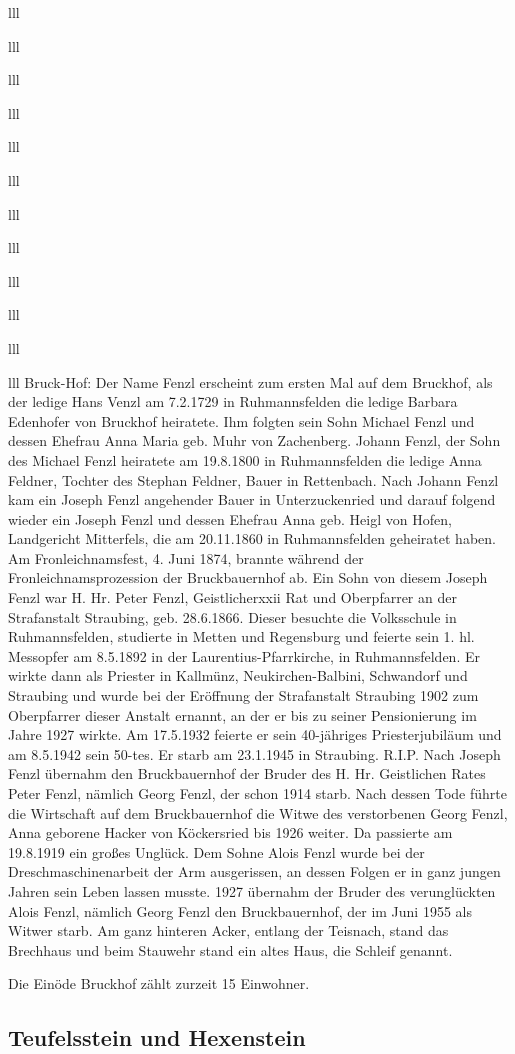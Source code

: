 \documentclass[12pt,a4pager]{book}
\begin{document}
\begin{tabuluar}{lll}
\begin{tabuluar}{lll}
\begin{tabuluar}{lll}
\begin{tabuluar}{lll}
\begin{tabuluar}{lll}
\begin{tabuluar}{lll}
\begin{tabuluar}{lll}
\begin{tabuluar}{lll}
\begin{tabuluar}{lll}
\begin{tabuluar}{lll}
\begin{tabuluar}{lll}
\begin{tabuluar}{lll}
Bruck-Hof: Der Name Fenzl erscheint zum ersten Mal auf dem Bruckhof, als der
ledige Hans Venzl am 7.2.1729 in Ruhmannsfelden die ledige Barbara Edenhofer von
Bruckhof heiratete. Ihm folgten sein Sohn Michael Fenzl und dessen Ehefrau Anna
Maria geb. Muhr von Zachenberg. Johann Fenzl, der Sohn des Michael Fenzl
heiratete am 19.8.1800 in Ruhmannsfelden die ledige Anna Feldner, Tochter des
Stephan Feldner, Bauer in Rettenbach. Nach Johann Fenzl kam ein Joseph Fenzl
angehender Bauer in Unterzuckenried und darauf folgend wieder ein Joseph Fenzl
und dessen Ehefrau Anna geb. Heigl von Hofen, Landgericht Mitterfels, die am
20.11.1860 in Ruhmannsfelden geheiratet haben. Am Fronleichnamsfest, 4. Juni
1874, brannte während der Fronleichnamsprozession der Bruckbauernhof ab. Ein
Sohn von diesem Joseph Fenzl war H. Hr. Peter Fenzl, Geistlicherxxii Rat und
Oberpfarrer an der Strafanstalt Straubing, geb. 28.6.1866. Dieser besuchte die
Volksschule in Ruhmannsfelden, studierte in Metten und Regensburg und feierte
sein 1. hl. Messopfer am 8.5.1892 in der Laurentius-Pfarrkirche, in
Ruhmannsfelden. Er wirkte dann als Priester in Kallmünz, Neukirchen-Balbini,
Schwandorf und Straubing und wurde bei der Eröffnung der Strafanstalt Straubing
1902 zum Oberpfarrer dieser Anstalt ernannt, an der er bis zu seiner
Pensionierung im Jahre 1927 wirkte. Am 17.5.1932 feierte er sein 40-jähriges
Priesterjubiläum und am 8.5.1942 sein 50-tes. Er starb am 23.1.1945 in
Straubing. R.I.P. Nach Joseph Fenzl übernahm den Bruckbauernhof der Bruder des
H. Hr. Geistlichen Rates Peter Fenzl, nämlich Georg Fenzl, der schon 1914 starb.
Nach dessen Tode führte die Wirtschaft auf dem Bruckbauernhof die Witwe des
verstorbenen Georg Fenzl, Anna geborene Hacker von Köckersried bis 1926 weiter.
Da passierte am 19.8.1919 ein großes Unglück. Dem Sohne Alois Fenzl wurde bei
der Dreschmaschinenarbeit der Arm ausgerissen, an dessen Folgen er in ganz
jungen Jahren sein Leben lassen musste. 1927 übernahm der Bruder des
verunglückten Alois Fenzl, nämlich Georg Fenzl den Bruckbauernhof, der im Juni
1955 als Witwer starb. Am ganz hinteren Acker, entlang der Teisnach, stand das
Brechhaus und beim Stauwehr stand ein altes Haus, die Schleif genannt.

Die Einöde Bruckhof zählt zurzeit 15 Einwohner.

\subsection{Teufelsstein und Hexenstein}


\end{tabuluar}
\end{tabuluar}
\end{tabuluar}
\end{tabuluar}
\end{tabuluar}
\end{tabuluar}
\end{tabuluar}
\end{tabuluar}
\end{tabuluar}
\end{tabuluar}
\end{tabuluar}
\end{tabuluar}
\end{document}
